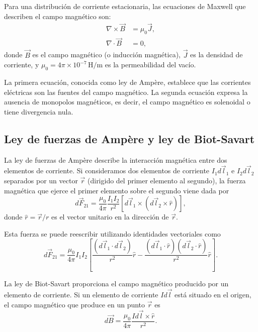 \documentclass[12pt,a4paper]{book}
\begin{document}
Para una distribución de corriente estacionaria, las ecuaciones de Maxwell que describen el campo magnético son:
\begin{align}
\nabla \times \vec{B} &= \mu_0 \vec{J},\\
\nabla \cdot \vec{B} &= 0,
\end{align}
donde $\vec{B}$ es el campo magnético (o inducción magnética), $\vec{J}$ es la densidad de corriente, y $\mu_0 = 4\pi \times 10^{-7} \, \textrm{H/m}$ es la permeabilidad del vacío.

La primera ecuación, conocida como ley de Ampère, establece que las corrientes eléctricas son las fuentes del campo magnético. La segunda ecuación expresa la ausencia de monopolos magnéticos, es decir, el campo magnético es solenoidal o tiene divergencia nula.

\subsection{Ley de fuerzas de Ampère y ley de Biot-Savart}

La ley de fuerzas de Ampère describe la interacción magnética entre dos elementos de corriente. Si consideramos dos elementos de corriente $I_1 d\vec{l}_1$ e $I_2 d\vec{l}_2$ separados por un vector $\vec{r}$ (dirigido del primer elemento al segundo), la fuerza magnética que ejerce el primer elemento sobre el segundo viene dada por
\begin{equation}
d\vec{F}_{21} = \frac{\mu_0}{4\pi} \frac{I_1 I_2}{r^2} [d\vec{l}_1 \times (d\vec{l}_2 \times \hat{r})],
\end{equation}
donde $\hat{r} = \vec{r}/r$ es el vector unitario en la dirección de $\vec{r}$.

Esta fuerza se puede reescribir utilizando identidades vectoriales como
\begin{equation}
d\vec{F}_{21} = \frac{\mu_0}{4\pi} I_1 I_2 \left[ \frac{(d\vec{l}_1 \cdot d\vec{l}_2)}{r^2} \hat{r} - \frac{(d\vec{l}_1 \cdot \hat{r})(d\vec{l}_2 \cdot \hat{r})}{r^2} \hat{r} \right].
\end{equation}

La ley de Biot-Savart proporciona el campo magnético producido por un elemento de corriente. Si un elemento de corriente $I d\vec{l}$ está situado en el origen, el campo magnético que produce en un punto $\vec{r}$ es
\begin{equation}
d\vec{B} = \frac{\mu_0}{4\pi} \frac{I d\vec{l} \times \hat{r}}{r^2}.
\end{equation}
\end{document}
